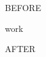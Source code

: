 \documentclass{article}
\begin{document}
BEFORE
\begin{algorithmic}
\State work 
\end{algorithmic}
AFTER
\end{document}
